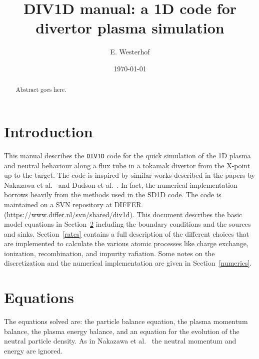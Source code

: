 \documentclass[amsmath,amssymb,a4]{revtex4}
\begin{document}
\title[DIV1D manual]{DIV1D manual: a 1D code for divertor plasma simulation}

\author{E. Westerhof}

\address{DIFFER -- Dutch Institute for Fundamental Energy Research, PO Box 6336, 5600HH Eindhoven, The Netherlands, www.differ.nl}

\vspace{10pt}
\date\today

\begin{abstract}
Abstract goes here.
\end{abstract}


\maketitle

\section{Introduction}

This manual describes the {\tt DIV1D} code for the quick simulation of the 1D plasma and neutral behaviour along a flux tube in a tokamak divertor from the X-point up to the target. The code is inspired by similar works described in the papers by Nakazawa et al.~\cite{nakazawa2000} and Dudson et al.~\cite{dudson2019, SD1D}. In fact, the numerical implementation borrows heavily from the methods used in the SD1D code. The code is maintained on a SVN repository at DIFFER (https://www.differ.nl/svn/shared/div1d). This document describes the basic model equations in Section~\ref{basic_equations} including the boundary conditions and the sources and sinks. Section~\ref{rates} contains a full description of the different choices that are implemented to calculate the various atomic processes like charge exchange, ionization, recombination, and impurity rafiation. Some notes on the discretization and the numerical implementation are given in Section~\ref{numerics}.


\section{Equations}\label{basic_equations}

The equations solved are: the particle balance equation, the plasma momentum balance, the plasma energy balance, and an equation for the evolution of the neutral particle density. As in Nakazawa et al.~\cite{nakazawa2000} the neutral momentum and energy are ignored.
\end{document}
